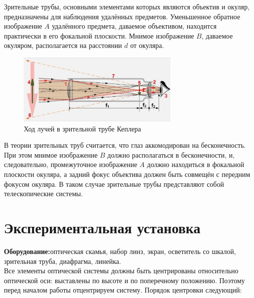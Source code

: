 Зрительные трубы, основными элементами которых являются объектив и окуляр, предназначены для наблюдения удалённых предметов. Уменьшенное обратное изображение $A$ удалённого предмета, даваемое объективом, находится практически в его фокальной плоскости. Мнимое изображение $B$, даваемое окуляром, располагается на расстоянии $d$ от окуляра.

\begin{figure}[h]
\centering
\includegraphics[width=0.7\textwidth]{images/kepler.png}
\caption{Ход лучей в зрительной трубе Кеплера}
\label{fig:telescope}
\end{figure}

В теории зрительных труб считается, что глаз аккомодирован на бесконечность. При этом мнимое изображение $B$ должно располагаться в бесконечности, и, следовательно, промежуточное изображение $A$ должно находиться в фокальной плоскости окуляра, а задний фокус объектива должен быть совмещён с передним фокусом окуляра. В таком случае зрительные трубы представляют собой телескопические системы.

\section*{Экспериментальная установка}
\textbf{Оборудование:}оптическая скамья, набор линз, экран, осветитель со шкалой, зрительная труба, диафрагма, линейка.\\

\indent Все элементы оптической системы должны быть центрированы относительно оптической оси: выставлены по высоте и по поперечному положению. Поэтому перед началом работы отцентрируем систему. Порядок центровки следующий:\\

